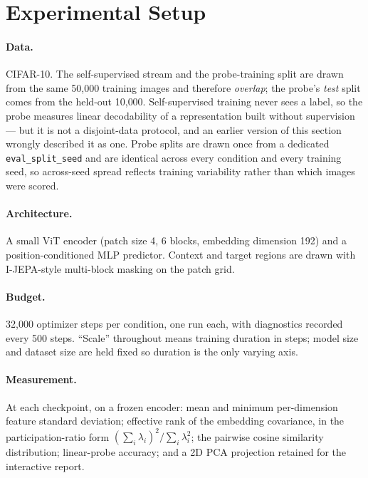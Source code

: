 \section{Experimental Setup}

\paragraph{Data.} CIFAR-10. The self-supervised stream and the probe-training split are
drawn from the same 50{,}000 training images and therefore \emph{overlap}; the probe's
\emph{test} split comes from the held-out 10{,}000. Self-supervised training never sees a
label, so the probe measures linear decodability of a representation built without
supervision --- but it is not a disjoint-data protocol, and an earlier version of this
section wrongly described it as one. Probe splits are drawn once from a dedicated
\texttt{eval\_split\_seed} and are identical across every condition and every training
seed, so across-seed spread reflects training variability rather than which images were
scored.

\paragraph{Architecture.} A small ViT encoder \citep{dosovitskiy2021vit} (patch size 4, 6
blocks, embedding dimension 192) and a position-conditioned MLP predictor. Context and
target regions are drawn with I-JEPA-style multi-block masking on the patch grid.

\paragraph{Budget.} 32{,}000 optimizer steps per condition, one run each, with diagnostics
recorded every 500 steps. ``Scale'' throughout means training duration in steps; model size
and dataset size are held fixed so duration is the only varying axis.

\paragraph{Measurement.} At each checkpoint, on a frozen encoder: mean and minimum
per-dimension feature standard deviation; effective rank of the embedding covariance, in the
participation-ratio form $(\sum_i \lambda_i)^2 / \sum_i \lambda_i^2$; the pairwise cosine
similarity distribution; linear-probe accuracy; and a 2D PCA projection retained for the
interactive report.

